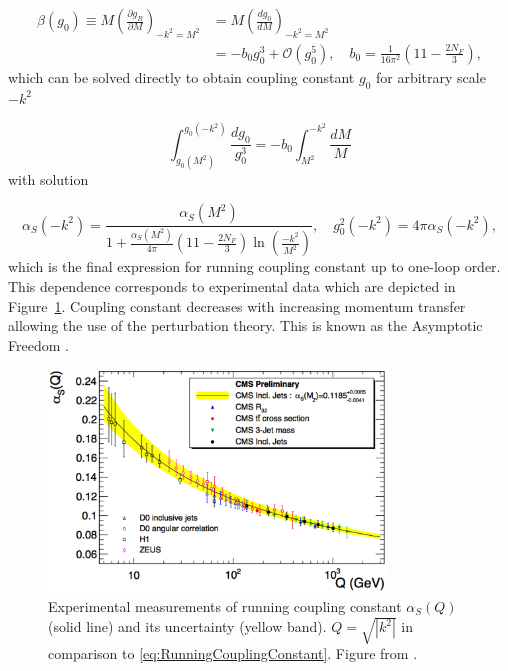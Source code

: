 \begin{align}
  \beta(g_0) \equiv M \left( \frac{\partial g_R}{\partial M} \right)_{-k^2=M^2}
  &= M \left( \frac{dg_0}{dM} \right)_{-k^2=M^2}
  \label{eq:BetaFunction1} \\
  &= -b_0 g_0^3 + \mathscr{O}(g_0^5)
  , \quad b_0 = \frac{1}{16\pi^2}\left(11-\frac{2N_F}{3}\right),
  \label{eq:BetaFunction2}
\end{align}
which can be solved directly to obtain coupling constant $g_0$ for arbitrary
scale $-k^2$

\begin{equation}
  \int_{g_0(M^2)}^{g_0(-k^2)} \frac{dg_0}{g_0^3} =
  -b_0 \int_{M^2}^{-k^2}\frac{dM}{M}
  \label{eq:RunningCouplingConstantIntegralEquation}
\end{equation}
with solution

\begin{equation}
  \alpha_S(-k^2) = \frac{\alpha_S(M^2)}{1 + \frac{\alpha_S(M^2)}{4\pi} \left(
  11-\frac{2N_F}{3} \right) \ln \left( \frac{-k^2}{M^2} \right) }
  , \quad g_0^2(-k^2) = 4 \pi \alpha_S( -k^2 ),
  \label{eq:RunningCouplingConstant}
\end{equation}
which is the final expression for running coupling constant up to one-loop
order. This dependence corresponds to experimental data which are depicted in
Figure~\ref{fig:RunningCouplingConstant}. Coupling constant decreases with
increasing momentum transfer allowing the use of the perturbation theory. This
is known as the Asymptotic Freedom \cite{AssymptoticFreedom}.

\begin{figure}[t]
  \centering
  \includegraphics[width=0.8\textwidth]{Chapter1/RunningCouplingConstant.png}
  \caption[Experimental measurements of running coupling constant $\alpha_S(Q)$
          (solid line) and its uncertainty (yellow band).
          $Q=\sqrt{\left|k^2\right|}$ in comparison to
          \eqref{eq:RunningCouplingConstant}.]
          {Experimental measurements of running
          coupling constant $\alpha_S(Q)$ (solid line) and its uncertainty (yellow
          band).  $Q=\sqrt{\left|k^2\right|}$ in comparison to
          \eqref{eq:RunningCouplingConstant}. Figure from
          \cite{RunningCouplingConstantMess}. }
  \label{fig:RunningCouplingConstant}
\end{figure}

